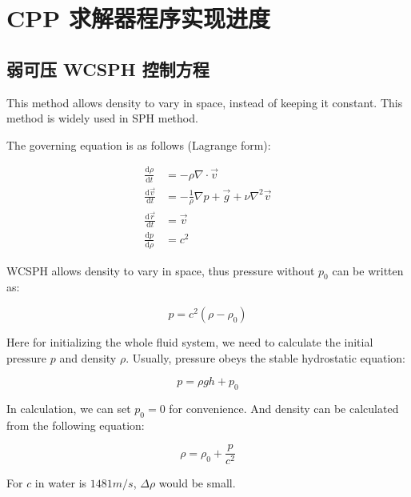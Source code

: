 \section{CPP 求解器程序实现进度}

\subsection{弱可压 WCSPH 控制方程}

\begin{frame}
    This method allows density to vary in space, instead of keeping it constant. 
This method is widely used in SPH method.

The governing equation is as follows (Lagrange form):

\begin{equation}
    \begin{aligned}
        \frac{\mathrm{d} \rho}{\mathrm{d} t} &= -\rho \nabla\cdot \vec{v}\\
        \frac{\mathrm{d} \vec{v}}{\mathrm{d} t} &= -\frac{1}{\rho}\nabla p + \vec{g} + \nu \nabla^2 \vec{v}\\
        \frac{\mathrm{d} \vec{r}}{\mathrm{d} t} &= \vec{v}\\
        \frac{\mathrm{d}p}{\mathrm{d} \rho} &= c^2
    \end{aligned}
\end{equation}

WCSPH allows density to vary in space, thus pressure without $p_0$ can be written as:

\begin{equation}
    p = c^2(\rho - \rho_0)
\end{equation}
\end{frame}

\begin{frame}
    Here for initializing the whole fluid system, 
we need to calculate the initial pressure $p$ and density $\rho$.
Usually, pressure obeys the stable hydrostatic equation:

\begin{equation}
    p = \rho g h+ p_0
\end{equation}

In calculation, we can set $p_0=0$ for convenience. 
And density can be calculated from the following equation:

\begin{equation}
    \rho = \rho_0 + \frac{p}{c^2}
\end{equation}

For $c$ in water is $1481m/s$, $\Delta\rho$ would be small.
\end{frame}

